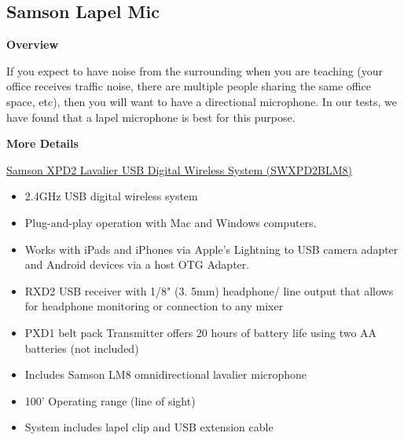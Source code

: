 \begin{gram}
\end{gram}

\begin{gram}
\end{gram}

\subsection{Samson Lapel Mic}
\label{sec:equipment::samsonlapel}

\begin{gram}
\label{grm:equipment::samsonlapel::main}

\textbf{Overview}

If you expect to have noise from the surrounding when you are teaching
(your office receives traffic noise, there are multiple people sharing
the same office space, etc), then you will want to have a
directional microphone.  
%
In our tests, we have found that a lapel microphone is best for this purpose.
%


\textbf{More Details}

\href{http://www.samsontech.com/samson/products/wireless-systems/xpd-series/xpd2lav/}
{Samson XPD2 Lavalier USB Digital Wireless System (SWXPD2BLM8)}

\begin{itemize}
\item 2.4GHz USB digital wireless system
\item Plug-and-play operation with Mac and Windows computers. 
\item Works with iPads and iPhones via Apple's Lightning to USB camera adapter and Android devices via a host OTG Adapter.

\item RXD2 USB receiver with 1/8" (3. 5mm) headphone/ line output that allows for headphone monitoring or connection to any mixer
\item PXD1 belt pack Transmitter offers 20 hours of battery life using two AA batteries (not included)
\item Includes Samson LM8 omnidirectional lavalier microphone
\item 100' Operating range (line of sight)
\item System includes lapel clip and USB extension cable
\end{itemize}


\end{gram}
